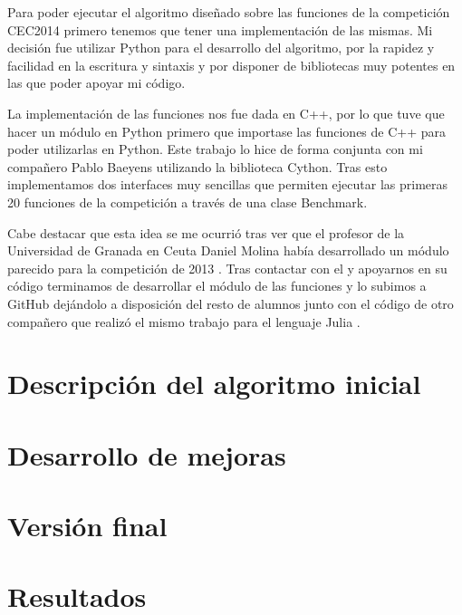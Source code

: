 \documentclass[12pt,a4paper]{article}
\begin{document}
		Para poder ejecutar el algoritmo diseñado sobre las funciones de la competición CEC2014 primero tenemos que tener una implementación de las mismas. Mi decisión fue utilizar Python para el desarrollo del algoritmo, por la rapidez y facilidad en la escritura y sintaxis y por disponer de bibliotecas muy potentes en las que poder apoyar mi código.
	
		La implementación de las funciones nos fue dada en C++, por lo que tuve que hacer un módulo en Python primero que importase las funciones de C++ para poder utilizarlas en Python. Este trabajo lo hice de forma conjunta con mi compañero Pablo Baeyens utilizando la biblioteca Cython. Tras esto implementamos dos interfaces muy sencillas que permiten ejecutar las primeras 20 funciones de la competición a través de una clase Benchmark.
		
		Cabe destacar que esta idea se me ocurrió tras ver que el profesor de la Universidad de Granada en Ceuta Daniel Molina había desarrollado un módulo parecido para la competición de 2013 \cite{danielMolinaCEC2013}. Tras contactar con el y apoyarnos en su código terminamos de desarrollar el módulo de las funciones y lo subimos a GitHub dejándolo a disposición del resto de alumnos junto con el código de otro compañero que realizó el mismo trabajo para el lenguaje Julia \cite{cec2014github}.

	\newpage

	\section{Descripción del algoritmo inicial}
	\label{sec:descripcionAlgoritmoInicial}
	
	
	
	\section{Desarrollo de mejoras}
	\label{sec:desarrolloMejoras}
	
	\section{Versión final}
	\label{sec:versionFinal}
	
	\section{Resultados}
	\label{sec:resultados}
	
	
	
	
	\newpage
	
\end{document}
